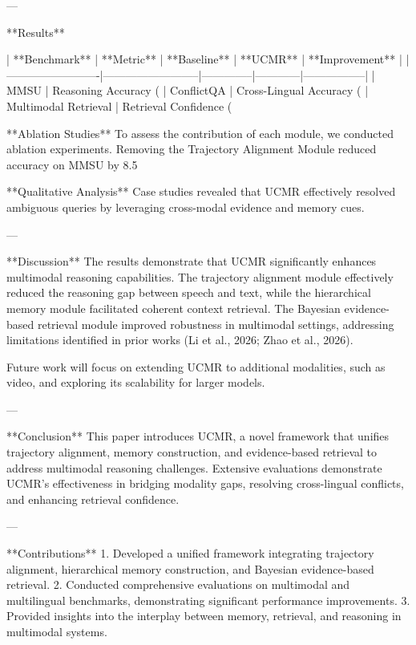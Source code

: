 ---

**Results**  

| **Benchmark**          | **Metric**               | **Baseline** | **UCMR**   | **Improvement** |
|-------------------------|--------------------------|--------------|------------|-----------------|
| MMSU                   | Reasoning Accuracy (%
| ConflictQA             | Cross-Lingual Accuracy (%
| Multimodal Retrieval   | Retrieval Confidence (%

**Ablation Studies**  
To assess the contribution of each module, we conducted ablation experiments. Removing the Trajectory Alignment Module reduced accuracy on MMSU by 8.5%

**Qualitative Analysis**  
Case studies revealed that UCMR effectively resolved ambiguous queries by leveraging cross-modal evidence and memory cues.  

---

**Discussion**  
The results demonstrate that UCMR significantly enhances multimodal reasoning capabilities. The trajectory alignment module effectively reduced the reasoning gap between speech and text, while the hierarchical memory module facilitated coherent context retrieval. The Bayesian evidence-based retrieval module improved robustness in multimodal settings, addressing limitations identified in prior works (Li et al., 2026; Zhao et al., 2026).  

Future work will focus on extending UCMR to additional modalities, such as video, and exploring its scalability for larger models.  

---

**Conclusion**  
This paper introduces UCMR, a novel framework that unifies trajectory alignment, memory construction, and evidence-based retrieval to address multimodal reasoning challenges. Extensive evaluations demonstrate UCMR's effectiveness in bridging modality gaps, resolving cross-lingual conflicts, and enhancing retrieval confidence.  

---

**Contributions**  
1. Developed a unified framework integrating trajectory alignment, hierarchical memory construction, and Bayesian evidence-based retrieval.  
2. Conducted comprehensive evaluations on multimodal and multilingual benchmarks, demonstrating significant performance improvements.  
3. Provided insights into the interplay between memory, retrieval, and reasoning in multimodal systems.  